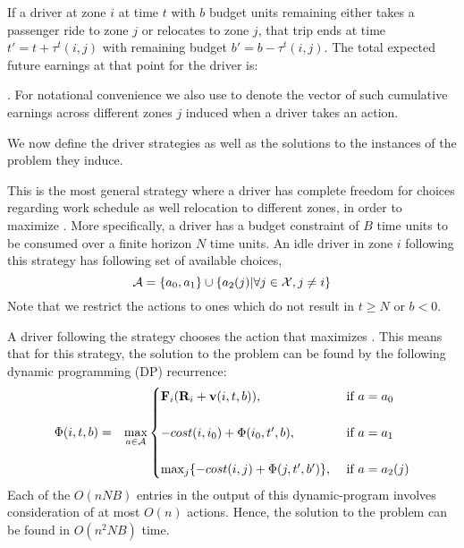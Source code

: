 If a driver at zone $i$ at time $t$ with $b$ budget units remaining either takes a passenger ride to zone $j$
or relocates to zone $j$, that trip ends at time 
$t' = t + \tau^t(i,j)$ with remaining budget $b' = b - \tau^t(i,j)$. The 
total expected future earnings at that point for the driver 
is: {. 
For notational convenience we also use
{} to denote the vector of such
cumulative earnings across different zones $j$ induced when a driver takes an  {\getpassengeraction} 
action.

We now define the driver strategies as well as the
solutions to the instances of the {\originalproblem} problem they induce.


This is the most general strategy where a driver has complete freedom for choices regarding work schedule as well relocation to different zones, in order to maximize {\totalexpectedearnings}. More specifically, a driver has a budget constraint of $B$ time units to be consumed over a finite horizon $N$ time units. An idle driver in zone $i$ following this strategy has following set of available choices,
\begin{equation}
\mathcal{A} =  \{a_0, a_1\} \cup \{a_2(j) | \forall j \in \mathcal{X}, j \neq i \}
\end{equation}
Note that we restrict the {\relocate} actions to ones which do not result in $t \geq N$ or $b < 0$.

A driver following the {\relocationflexible} strategy chooses the action that maximizes {\totalexpectedearnings}. This means that for this strategy, the solution to
the {\originalproblem} problem can be found by the following dynamic programming (DP)
recurrence:
\begin{eqnarray}
\label{eq:relocationflexible_strategy}
\Phi({i,t,b}) &=& \max_{a \in \mathcal{A}}
    \begin{cases}
    {\ensuremath{\mathbf{F}}}_{i} ({\mathbf{R}}_{i} +  \mathbf{v}({i},{t,b})), &\textrm{  if } a = a_0\\ \\
    -cost(i,{i_0}) + \Phi({{i_0},t',b}), &\textrm{  if } a = a_1 \\ \\
    \max_{j} \{-cost(i,j) + \Phi({j,t',b'})\}, &\textrm{  if } a = a_2(j)
    \end{cases}
\end{eqnarray}
Each of the $O(n N B)$ entries in the output of this dynamic-program involves consideration of at most $O(n)$ actions. 
Hence, the solution to the {\originalproblem} problem can be found in $O(n^2 N B)$ time.

}
